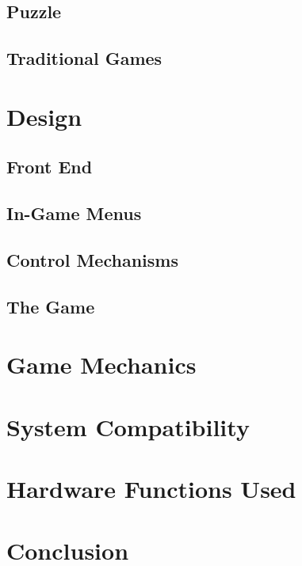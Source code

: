\documentclass{article}
\begin{document}
\subsection{Puzzle}
\subsection{Traditional Games}
	
\section{Design}
\subsection{Front End}
\subsection{In-Game Menus}
\subsection{Control Mechanisms}
\subsection{The Game}
\section{Game Mechanics}
\section{System Compatibility}
\section{Hardware Functions Used}
\section{Conclusion}
 
\end{document}
